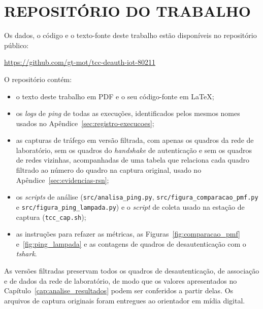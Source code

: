 \chapter*{REPOSITÓRIO DO TRABALHO}
\label{cap:repositorio}

Os dados, o código e o texto-fonte deste trabalho estão disponíveis no repositório público:

\begin{center}
\url{https://github.com/gt-mot/tcc-deauth-iot-80211}
\end{center}

O repositório contém:

\begin{itemize}
    \item o texto deste trabalho em PDF e o seu código-fonte em \LaTeX{};
    \item os \textit{logs} de \textit{ping} de todas as execuções, identificados pelos mesmos nomes usados no Apêndice~\ref{sec:registro-execucoes};
    \item as capturas de tráfego em versão filtrada, com apenas os quadros da rede de laboratório, sem os quadros do \textit{handshake} de autenticação e sem os quadros de redes vizinhas, acompanhadas de uma tabela que relaciona cada quadro filtrado ao número do quadro na captura original, usado no Apêndice~\ref{sec:evidencias-rsn};
    \item os \textit{scripts} de análise (\texttt{src/analisa\_ping.py}, \texttt{src/figura\_comparacao\_pmf.py} e \texttt{src/figura\_ping\_lampada.py}) e o \textit{script} de coleta usado na estação de captura (\texttt{tcc\_cap.sh});
    \item as instruções para refazer as métricas, as Figuras~\ref{fig:comparacao_pmf} e~\ref{fig:ping_lampada} e as contagens de quadros de desautenticação com o \textit{tshark}.
\end{itemize}

As versões filtradas preservam todos os quadros de desautenticação, de associação e de dados da rede de laboratório, de modo que os valores apresentados no Capítulo~\ref{cap:analise_resultados} podem ser conferidos a partir delas. Os arquivos de captura originais foram entregues ao orientador em mídia digital.
